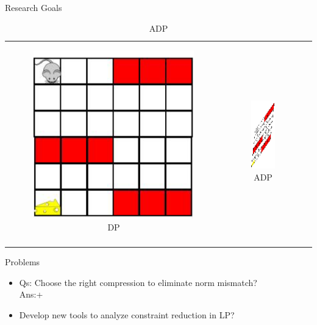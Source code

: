 \documentclass[10pt,handout]{beamer}
\begin{document}
\begin{frame}[fragile]{Research Goals}
\begin{table}
\begin{tabular}{ccc}

\begin{minipage}{0.3\textwidth}
\begin{figure}
\includegraphics[scale=0.2]{mouse-single.png}
\caption*{DP}
\end{figure}
\end{minipage}
&
\begin{minipage}{0.3\textwidth}
\begin{figure}
\includegraphics[scale=0.2]{compress-mouse.png}
\caption*{ADP}
\end{figure}
\end{minipage}
&
\begin{minipage}{0.3\textwidth}
{\color{orange}{$\norm{J^*-J_{\tu}}$}}\\
\end{minipage}
\end{tabular}
\end{table}
\begin{block}{Problems}
\begin{itemize}
\item Qs: Choose the right compression to eliminate norm mismatch?\\
{Ans:\color{teal}{$\minp$ linear basis}}+ \cite{melo2007q}
\item Develop new tools to analyze constraint reduction in LP?
\end{itemize}
\end{block}
\end{frame}
\end{document}

